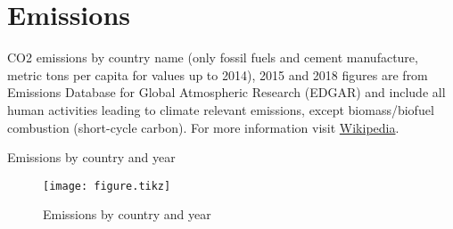 \documentclass{article}
\begin{document}
\section{Emissions}
CO2 emissions by country name (only fossil fuels and cement manufacture, metric
tons per capita for values up to 2014), 2015 and 2018 figures are from
Emissions Database for Global Atmospheric Research (EDGAR) and include all
human activities leading to climate relevant emissions, except biomass/biofuel
combustion (short-cycle carbon). For more information visit
\href{https://en.wikipedia.org/wiki/List_of_countries_by_carbon_dioxide_emissions_per_capita}{Wikipedia}.

\begin{table}
        \centering
        \caption{Emissions by country and year}
        
\end{table}

\begin{figure}
        \centering
        \texttt{[image: figure.tikz]}\\
        \caption{Emissions by country and year}

\end{figure}
\end{document}
